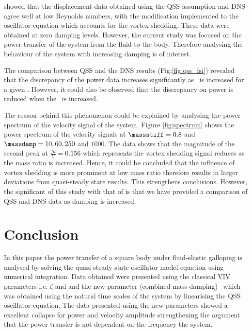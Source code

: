 
\citet{Joly2012} showed that the displacement data obtained using the QSS assumption and DNS agree well at low Reynolds numbers, with the modification implemented to the oscillator equation which accounts for the vortex shedding. These data were obtained at zero damping levels. However, the current study was focused on the power transfer of the system from the fluid to the body. Therefore analysing the behaviour of the system with increasing damping is of interest.

The comparison between QSS and the DNS results (Fig:\ref{fig:qss_fsi}) revealed that
the discrepancy of the power data  increases significantly as \massdamp \ is increased for a given \massstiff. However, it could also be observed that the discrepancy on power is reduced when the \massstiff \ is increased. 

\begin{center}
	
\end{center}


The reason behind this phenomenon could be explained by analysing the power spectrum of the velocity signal of the system. Figure \ref{fig:spectrum} shows the power spectrum of the velocity signals at $\massstiff=0.8$ and $\massdamp= 10, 60, 250$ and $1000$. The data shows that the  magnitude of the second peak at $\frac{fd}{U}=0.156$ which represents the vortex shedding signal reduces as the mass ratio is increased. Hence, it could be concluded that the influence of vortex shedding is more prominent at low mass ratio therefore results in larger deviations from quasi-steady state results. This strengthens \cite{Joly2012} conclusions. However, the significant of this study with that of \cite{Joly2012} is that we have provided a comparison of QSS and DNS data as damping is increased. 






 
 
 
 
 
 \section{Conclusion}
  \label{sec:conc}
  In this paper the power transfer of a square body under fluid-elastic galloping is analysed by solving the quasi-steady state oscillator model equation using numerical  integration. Data obtained were presented using the classical VIV parameters i.e. $\zeta$ and \ustar and the new parameter (combined mass-damping) \massdamp \ which was obtained using the natural time scales of the system by linearising the QSS oscillator equation. The data presented using the new parameters showed a excellent collapse for power and velocity amplitude strengthening the argument that the power transfer is not dependent on the frequency the system.   
 
